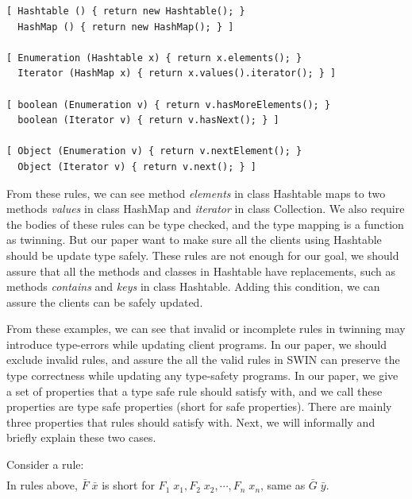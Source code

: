 \begin{verbatim}
[ Hashtable () { return new Hashtable(); }
  HashMap () { return new HashMap(); } ]

[ Enumeration (Hashtable x) { return x.elements(); }
  Iterator (HashMap x) { return x.values().iterator(); } ]

[ boolean (Enumeration v) { return v.hasMoreElements(); }
  boolean (Iterator v) { return v.hasNext(); } ]

[ Object (Enumeration v) { return v.nextElement(); }
  Object (Iterator v) { return v.next(); } ]
\end{verbatim}

From these rules, we can see method \textit{elements} in class Hashtable
maps to two methods \textit{values} in class HashMap and \textit{iterator} in
class Collection. We also require the bodies of these rules can be type checked,
and the type mapping is a function as twinning. But our paper want to make sure
all the clients using Hashtable should be update type safely. These rules are
not enough for our goal, we should assure that all the methods and classes in
Hashtable have replacements, such as methods \textit{contains} and \textit{keys} in class
Hashtable. Adding this condition, we can assure the clients
can be safely updated.


From these examples, we can see that invalid or incomplete rules in twinning 
may introduce type-errors
while updating client programs. In our paper, we should exclude invalid rules, 
and assure the all the valid rules in SWIN can preserve the type
correctness while updating any type-safety programs. 
In our paper, we give a set of properties that a type safe rule
should satisfy with, and we call these properties are type safe properties 
(short for safe properties). There are mainly three properties that rules
should satisfy with. Next, we will informally and briefly explain these two cases. 

Consider a rule:
\begin{align*}
    [ \quad &T_{1} \quad ( \bar{F} \quad \bar{x} ) \quad \{ \quad B_{1} \quad \} \\
     &T_{2} \quad ( \bar{G} \quad \bar{y}) \quad \{ \quad B_{2} \quad \} \quad]
 \end{align*}
 In rules above, $\bar{F}\; \bar{x}$ is short for $F_{1}\;x_{1},F_{2}\;x_{2},\cdots,F_{n}\;x_{n}$,
 same as $\bar{G}\;\bar{y}$. 

